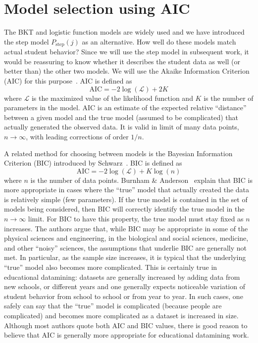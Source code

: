 \documentclass{edm_template}
\begin{document}
\section{Model selection using AIC}
\label{model-selection}

The BKT and logistic function models are widely used and
we have introduced the step model $P_\mathrm{step}(j)$
as an alternative.  How
well do these models match actual student behavior?
Since we will use the step model in subsequent
work, it would be reassuring to know whether it describes the student data as 
well (or better than) the other two models.  We will use the Akaike Information Criterion (AIC) for this purpose~\cite{akaike_new_1974,burnham_model_2002}.
AIC is defined as
%
\begin{equation}
   \mathrm{AIC}= -2 \log\left(\mathcal{L}\right) + 2K
\end{equation}
% 
where $\mathcal{L}$ is the maximized value of the likelihood function
and $K$ is the number of parameters in the model.
 AIC is an estimate of the expected relative ``distance''
between a given model and the true model (assumed to be complicated) 
that actually generated the observed data.  It is valid in limit of 
many data points, $n\to\infty$, with leading corrections of order $1/n$.

A related method for choosing between models is the Bayesian
Information Criterion (BIC) introduced by
Schwarz~\citeyear{schwarz_estimating_1978}.  BIC is defined as
%
\begin{equation}
   \mathrm{AIC}= -2 \log\left(\mathcal{L}\right) + K \log\left(n\right)
\end{equation}
% 
where $n$ is the number of data points.
Burnham \& Anderson~\citeyear[Sections~6.3 \& 6.4]{burnham_model_2002} explain
that BIC is more appropriate in cases where the ``true'' model that
actually created the data is relatively simple (few parameters).  If
the true model is contained in the set of models being considered,
then BIC will correctly identify the true model in the $n\to\infty$
limit.  For BIC to have this property, the true model must stay fixed as 
$n$ increases.  
The authors argue that, while BIC may be appropriate in some
of the physical sciences and engineering, in the biological and social
sciences, medicine, and other ``noisy'' sciences, the assumptions that
underlie BIC are generally not met.  In particular, as the sample size
increases, it is typical that the underlying ``true'' model also
becomes more complicated.  This is certainly true in educational
datamining: datasets are generally increased by adding data from new schools, or
different years and one generally expects noticeable variation of student
behavior from school to school or from year to year.  In such cases, one
safely can say that the ``true'' model is complicated (because people are
complicated) and becomes more complicated as a dataset is increased in
size.  Although most authors quote both AIC and BIC values, there
is good reason to believe that AIC is generally more appropriate for
educational datamining work.
\end{document}
